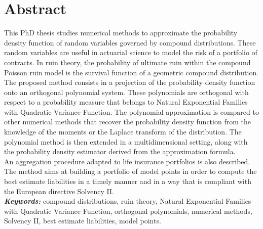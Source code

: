 \chapter*{Abstract}
 




This PhD thesis studies numerical methods to approximate the probability density function of random variables governed by compound distributions. These random variables are useful in actuarial science to model the risk of a portfolio of contracts. In ruin theory, the probability of ultimate ruin within the compound Poisson ruin model is the survival function of a geometric compound distribution. The proposed method consists in a projection of the probability density function onto an orthogonal polynomial system. These polynomials are orthogonal with respect to a probability measure that belongs to Natural Exponential Families with Quadratic Variance Function. The polynomial approximation is compared to other numerical methods that recover the probability density function from the knowledge of the moments or the Laplace transform of the distribution. The polynomial method is then extended in a multidimensional setting, along with the probability density estimator derived from the approximation formula.\\

An aggregation procedure adapted to life insurance portfolios is also described. The method aims at building a portfolio of model points in order to compute the best estimate liabilities in a timely manner and in a way that is compliant with the European directive Solvency II. 
\\

\textbf{\textit{Keywords:}} compound distributions, ruin theory, Natural Exponential Families with Quadratic Variance Function, orthogonal polynomials, numerical methods, Solvency II, best estimate liabilities, model points. 
   
 
